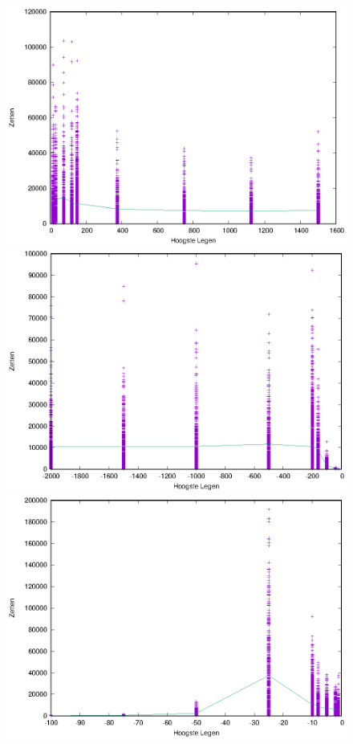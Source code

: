 \documentclass[10pt]{article}
\begin{document}
\begin{figure}
\begin{center}
	\includegraphics[height="5cm"]{div3.eps}
	\includegraphics[height="5cm"]{div4.eps}
	\includegraphics[height="5cm"]{div5.eps}
\end{center}
\end{figure}
\end{document}
